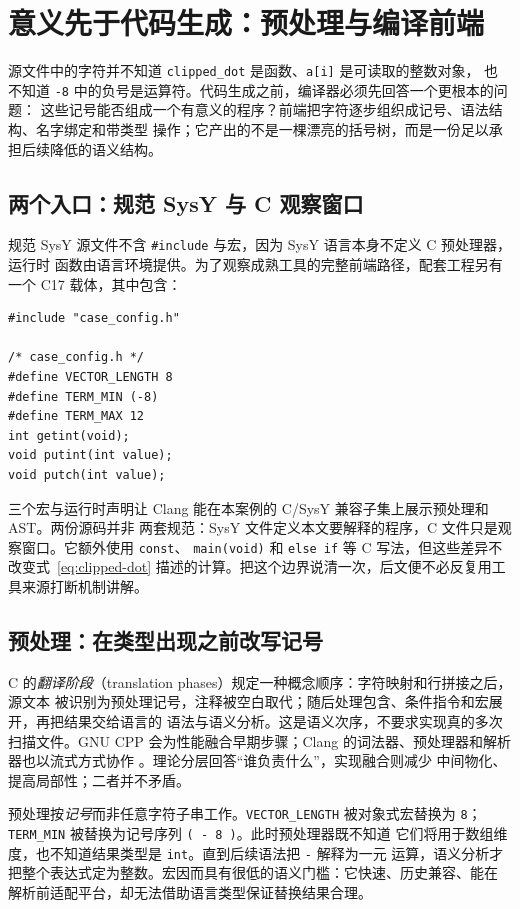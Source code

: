 \section{意义先于代码生成：预处理与编译前端}
\label{sec:frontend}

源文件中的字符并不知道 \texttt{clipped\_dot} 是函数、\texttt{a[i]} 是可读取的整数对象，
也不知道 \texttt{-8} 中的负号是运算符。代码生成之前，编译器必须先回答一个更根本的问题：
这些记号能否组成一个有意义的程序？前端把字符逐步组织成记号、语法结构、名字绑定和带类型
操作；它产出的不是一棵漂亮的括号树，而是一份足以承担后续降低的语义结构。

\subsection{两个入口：规范 SysY 与 C 观察窗口}

规范 SysY 源文件不含 \texttt{\#include} 与宏，因为 SysY 语言本身不定义 C 预处理器，运行时
函数由语言环境提供。为了观察成熟工具的完整前端路径，配套工程另有一个 C17 载体，其中包含：
\begin{verbatim}
#include "case_config.h"

/* case_config.h */
#define VECTOR_LENGTH 8
#define TERM_MIN (-8)
#define TERM_MAX 12
int getint(void);
void putint(int value);
void putch(int value);
\end{verbatim}
三个宏与运行时声明让 Clang 能在本案例的 C/SysY 兼容子集上展示预处理和 AST。两份源码并非
两套规范：SysY 文件定义本文要解释的程序，C 文件只是观察窗口。它额外使用 \texttt{const}、
\texttt{main(void)} 和 \texttt{else if} 等 C 写法，但这些差异不改变式~\eqref{eq:clipped-dot}
描述的计算。把这个边界说清一次，后文便不必反复用工具来源打断机制讲解。

\subsection{预处理：在类型出现之前改写记号}

C 的\emph{翻译阶段}（translation phases）规定一种概念顺序：字符映射和行拼接之后，源文本
被识别为预处理记号，注释被空白取代；随后处理包含、条件指令和宏展开，再把结果交给语言的
语法与语义分析\cite{front-c-n1570}。这是语义次序，不要求实现真的多次扫描文件。GNU CPP
会为性能融合早期步骤；Clang 的词法器、预处理器和解析器也以流式方式协作
\cite{front-gcc-cpp-initial,front-clang-internals}。理论分层回答“谁负责什么”，实现融合则减少
中间物化、提高局部性；二者并不矛盾。

预处理按\emph{记号}而非任意字符子串工作。\texttt{VECTOR\_LENGTH} 被对象式宏替换为
\texttt{8}；\texttt{TERM\_MIN} 被替换为记号序列 \texttt{( - 8 )}。此时预处理器既不知道
它们将用于数组维度，也不知道结果类型是 \texttt{int}。直到后续语法把 \texttt{-} 解释为一元
运算，语义分析才把整个表达式定为整数。宏因而具有很低的语义门槛：它快速、历史兼容、能在
解析前适配平台，却无法借助语言类型保证替换结果合理。

